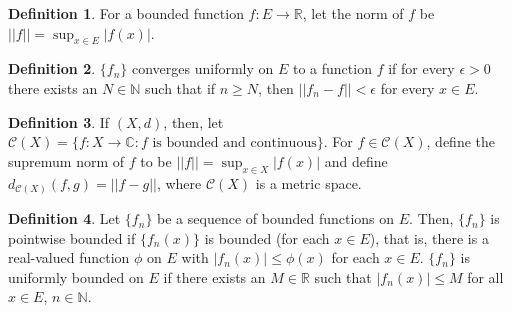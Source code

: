 \documentclass[12pt]{article}
\theoremstyle{definition}
\newtheorem{definition}{Definition}
\theoremstyle{named}
\begin{document}
\renewcommand{\thedefinition}{6.1}
\begin{definition}
    For a bounded function $f: E \to \mathbb{R}$, let the norm of $f$ be $||f|| = \sup_{x \in E} |f(x)|$. 
\end{definition}

\renewcommand{\thedefinition}{6.1}
\begin{definition}
    $\{f_n\}$ converges uniformly on $E$ to a function $f$ if for every $\epsilon > 0$ there exists an $N \in \mathbb{N}$ such that if $n \geq N$, then $||f_n - f|| < \epsilon$ for every $x \in E$. 
\end{definition}

\renewcommand{\thedefinition}{6.1}
\begin{definition}
    If $(X,d)$, then, let $\mathscr{C}(X) = \{f: X \to \mathbb{C}: f \text{ is bounded and continuous}\}$. For $f \in \mathscr{C}(X)$, define the supremum norm of $f$ to be $||f|| = \sup_{x \in X} |f(x)|$ and define $d_{\mathscr{C}(X)}(f,g) = ||f-g||$, where $\mathscr{C}(X)$ is a metric space. 
\end{definition}

\renewcommand{\thedefinition}{6.1}
\begin{definition}
    Let $\{f_n\}$ be a sequence of bounded functions on $E$. Then, $\{f_n\}$ is pointwise bounded if $\{f_n(x)\}$ is bounded (for each $x \in E$), that is, there is a real-valued function $\phi$ on $E$ with $|f_n(x)| \leq \phi(x)$ for each $x \in E$. $\{f_n\}$ is uniformly bounded on $E$ if there exists an $M \in \mathbb{R}$ such that $|f_n(x)| \leq M$ for all $x \in E$, $n \in \mathbb{N}$. 
\end{definition}
\end{document}
